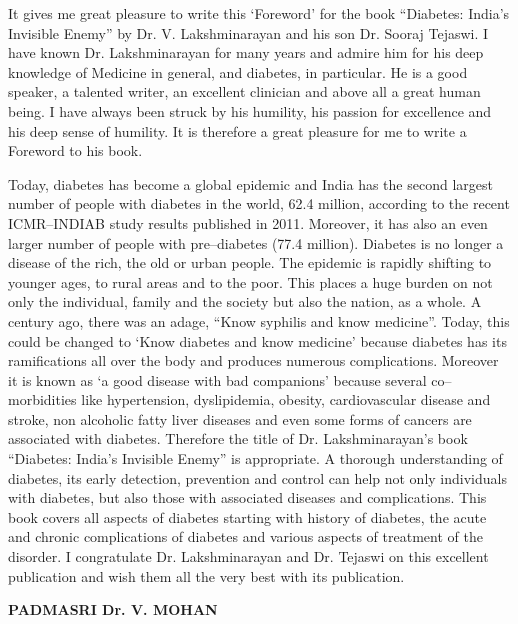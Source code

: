It gives me great pleasure to write this ‘Foreword’ for the book “Diabetes: India's Invisible Enemy” by Dr. V. Lakshminarayan and his son Dr. Sooraj Tejaswi. I have known Dr. Lakshminarayan for many years and admire him for his deep knowledge of Medicine in general, and diabetes, in particular. He is a good speaker, a talented writer, an excellent clinician and above all a great human being. I have always been struck by his humility, his passion for excellence and his deep sense of humility. It is therefore a great pleasure for me to write a Foreword to his book.

Today, diabetes has become a global epidemic and India has the second largest number of people with diabetes in the world, 62.4 million, according to the recent ICMR–INDIAB study results published in 2011. Moreover, it has also an even larger number of people with pre–diabetes (77.4 million). Diabetes is no longer a disease of the rich, the old or urban people. The epidemic is rapidly shifting to younger ages, to rural areas and to the poor. This places a huge burden on not only the individual, family and the society but also the nation, as a whole. A century ago, there was an adage, “Know syphilis and know medicine”. Today, this could be changed to ‘Know diabetes and know medicine’ because diabetes has its ramifications all over the body and produces numerous complications. Moreover it is known as ‘a good disease with bad companions’ because several co–morbidities like hypertension, dyslipidemia, obesity, cardiovascular disease and stroke, non alcoholic fatty liver diseases and even some forms of cancers are associated with diabetes. Therefore the title of Dr. Lakshminarayan’s book “Diabetes: India's Invisible Enemy” is appropriate. A thorough understanding of diabetes, its early detection, prevention and control can help not only individuals with diabetes, but also those with associated diseases and complications. This book covers all aspects of diabetes starting with history of diabetes, the acute and chronic complications of diabetes and various aspects of treatment of the disorder. I congratulate Dr. Lakshminarayan and Dr. Tejaswi on this excellent publication and wish them all the very best with its publication.

\begin{flushright}
\textbf{PADMASRI Dr. V. MOHAN}
\end{flushright}

